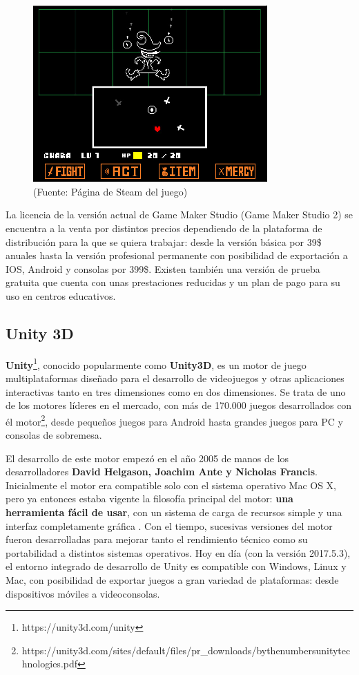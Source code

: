 \begin{figure}[h]
	\includegraphics[width=0.8\textwidth]{images/estadodelarte/motores/undertale}
	\centering
	\caption{ (Fuente: Página de Steam del juego)}
	\label{undertale}
\end{figure}

La licencia de la versión actual de Game Maker Studio (Game Maker Studio 2) se encuentra a la venta por distintos precios dependiendo de la plataforma de distribución para la que se quiera trabajar: desde la versión básica por 39\$ anuales hasta la versión profesional permanente con posibilidad de exportación a IOS, Android y consolas por 399\$. Existen también una versión de prueba gratuita que cuenta con unas prestaciones reducidas y un plan de pago para su uso en centros educativos.

\subsection{Unity 3D}
\textbf{Unity}\footnote{https://unity3d.com/unity}, conocido popularmente como \textbf{Unity3D}, es un motor de juego multiplataformas diseñado para el desarrollo de videojuegos y otras aplicaciones interactivas tanto en tres dimensiones como en dos dimensiones. Se trata de uno de los motores líderes en el mercado, con más de 170.000 juegos desarrollados con él motor\footnote{https://unity3d.com/sites/default/files/pr\_downloads/bythenumbersunitytechnologies.pdf}, desde pequeños juegos para Android hasta grandes juegos para PC y consolas de sobremesa.

El desarrollo de este motor empezó en el año 2005 de manos de los desarrolladores \textbf{David Helgason, Joachim Ante y Nicholas Francis}. Inicialmente el motor era compatible solo con el sistema operativo Mac OS X, pero ya entonces estaba vigente la filosofía principal del motor: \textbf{una herramienta fácil de usar}, con un sistema de carga de recursos simple y una interfaz completamente gráfica \cite{unity_story}. Con el tiempo, sucesivas versiones del motor fueron desarrolladas para mejorar tanto el rendimiento técnico como su portabilidad a distintos sistemas operativos. Hoy en día (con la versión 2017.5.3), el entorno integrado de desarrollo de Unity es compatible con Windows, Linux y Mac, con posibilidad de exportar juegos a gran variedad de plataformas: desde dispositivos móviles a videoconsolas.

